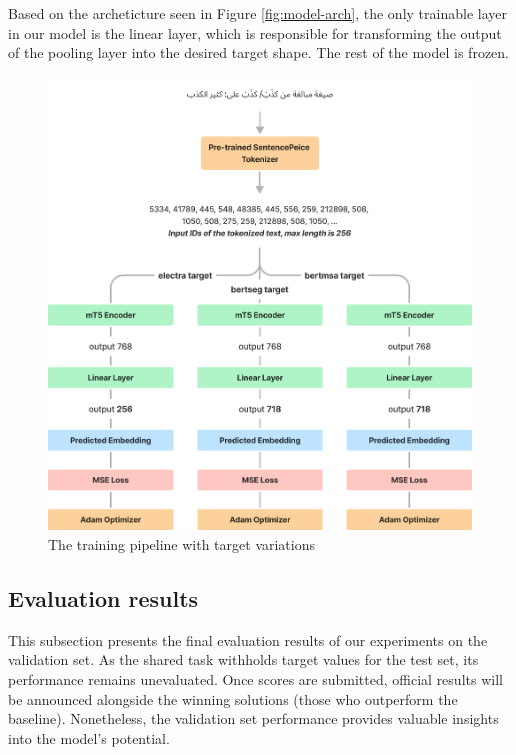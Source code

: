 \documentclass[12pt]{article}
\begin{document}
Based on the archeticture seen in Figure \ref{fig:model-arch}, the only trainable layer in our model is the linear layer, which is responsible for transforming the output of the pooling layer into the desired target shape. The rest of the model is frozen.

\begin{figure}[H]
    \centering
    \captionsetup{justification=centering}
    \includegraphics[width=\textwidth]{training.png}
    \caption{The training pipeline with target variations}
    \label{fig:training}
\end{figure}

\newpage

\subsection{Evaluation results}

This subsection presents the final evaluation results of our experiments on the validation set. As the shared task withholds target values for the test set, its performance remains unevaluated. Once scores are submitted, official results will be announced alongside the winning solutions (those who outperform the baseline). Nonetheless, the validation set performance provides valuable insights into the model's potential.
\end{document}

